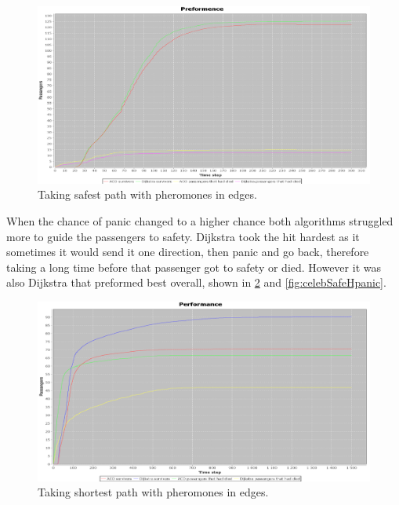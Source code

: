 \begin{figure} [h]
\centering
\hspace*{-1.0in}
\includegraphics[scale=0.35]{images/Graph-using-200-rounds-140-passangers-and-safest-first-one-hazzard-and-ACO-having-pheremons-in-edges.png}
\caption{Taking safest path with pheromones in edges.}
\label{fig:celebSafePherInEdges}
\end{figure}


When the chance of panic changed to a higher chance both algorithms struggled more to guide the passengers to safety. Dijkstra took the hit hardest as it sometimes it would send it one direction, then panic and go back, therefore taking a long time before that passenger got to safety or died. However it was also Dijkstra that preformed best overall, shown in \ref{fig:celebShortHPanic} and \ref{fig:celebSafeHpanic}.

\begin{figure} [h]
\centering
\hspace*{-1.0in}
\includegraphics[scale=0.35]{images/Graph-using-1000-rounds-140-passangers-shortestpath-and-one-fire-high-panic.png}
\caption{Taking shortest path with pheromones in edges.}
\label{fig:celebShortHPanic}
\end{figure}

